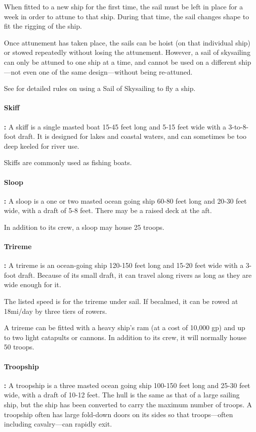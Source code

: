 \begin{multicols*}{2}
When fitted to a new ship for the first time, the sail must be left in place for a week in order to attune to that ship. During that time, the sail changes shape to fit the rigging of the ship.

Once attunement has taken place, the sails can be hoist (on that individual ship) or stowed repeatedly without losing the attunement. However, a sail of skysailing can only be attuned to one ship at a time, and cannot be used on a different ship—not even one of the same design—without being re-attuned.

See  for detailed rules on using a Sail of Skysailing to fly a ship.

\paragraph{Skiff}\textbf{:} A skiff is a single masted boat 15-45 feet long and 5-15 feet wide with a 3-to-8-foot draft. It is designed for lakes and coastal waters, and can sometimes be too deep keeled for river use.

Skiffs are commonly used as fishing boats.

\paragraph{Sloop}\textbf{:} A sloop is a one or two masted ocean going ship 60-80 feet long and 20-30 feet wide, with a draft of 5-8 feet. There may be a raised deck at the aft.

In addition to its crew, a sloop may house 25 troops.

\paragraph{Trireme}\textbf{:} A trireme is an ocean-going ship 120-150 feet long and 15-20 feet wide with a 3-foot draft. Because of its small draft, it can travel along rivers as long as they are wide enough for it.

The listed speed is for the trireme under sail. If becalmed, it can be rowed at 18mi/day by three tiers of rowers.

A trireme can be fitted with a heavy ship’s ram (at a cost of 10,000 gp) and up to two light catapults or cannons. In addition to its crew, it will normally house 50 troops.

\paragraph{Troopship}\textbf{:} A troopship is a three masted ocean going ship 100-150 feet long and 25-30 feet wide, with a draft of 10-12 feet. The hull is the same as that of a large sailing ship, but the ship has been converted to carry the maximum number of troops. A troopship often has large fold-down doors on its sides so that troops—often including cavalry—can rapidly exit.


\end{multicols*}
